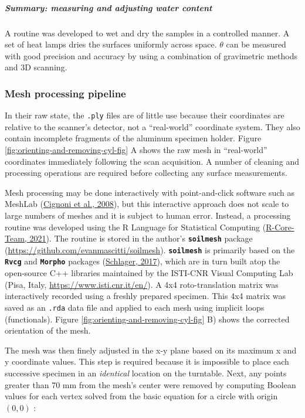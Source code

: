 \documentclass[
  letterpaper,
  openany]{book}
\begin{document}
\hypertarget{summary-measuring-and-adjusting-water-content}{%
\subparagraph{Summary: measuring and adjusting water content}\label{summary-measuring-and-adjusting-water-content}}

A routine was developed to wet and dry the samples in a controlled manner.
A set of heat lamps dries the surfaces uniformly across space.
\(\theta\) can be measured with good precision and accuracy by using a combination of gravimetric methods and 3D scanning.

\hypertarget{mesh-processing-pipeline}{%
\subsubsection{Mesh processing pipeline}\label{mesh-processing-pipeline}}

In their raw state, the \texttt{.ply} files are of little use because their coordinates are relative to the scanner's detector, not a ``real-world'' coordinate system.
They also contain incomplete fragments of the aluminum specimen holder.
Figure \ref{fig:orienting-and-removing-cyl-fig} A shows the raw mesh in ``real-world'' coordinates immediately following the scan acquisition.
A number of cleaning and processing operations are required before collecting any surface measurements.

Mesh processing may be done interactively with point-and-click software such as MeshLab (\protect\hyperlink{ref-Cignoni2008}{Cignoni et al., 2008}), but this interactive approach does not scale to large numbers of meshes and it is subject to human error.
Instead, a processing routine was developed using the R Language for Statistical Computing (\protect\hyperlink{ref-R-core2021}{R-Core-Team, 2021}).
The routine is stored in the author's \textbf{\texttt{soilmesh}} package (\url{https://github.com/evanmascitti/soilmesh}).
\textbf{\texttt{soilmesh}} is primarily based on the \textbf{\texttt{Rvcg}} and \textbf{\texttt{Morpho}} packages (\protect\hyperlink{ref-Schlager2017}{Schlager, 2017}), which are in turn built atop the open-source C++ libraries maintained by the ISTI-CNR Visual Computing Lab (Pisa, Italy, \url{https://www.isti.cnr.it/en/}).
A 4x4 roto-translation matrix was interactively recorded using a freshly prepared specimen.
This 4x4 matrix was saved as an \texttt{.rda} data file and applied to each mesh using implicit loops (functionals).
Figure \ref{fig:orienting-and-removing-cyl-fig} B) shows the corrected orientation of the mesh.

The mesh was then finely adjusted in the x-y plane based on its maximum x and y coordinate values.
This step is required because it is impossible to place each successive specimen in an \emph{identical} location on the turntable.
Next, any points greater than 70 mm from the mesh's center were removed by computing Boolean values for each vertex solved from the basic equation for a circle with origin \((0,0)\) :
\end{document}
